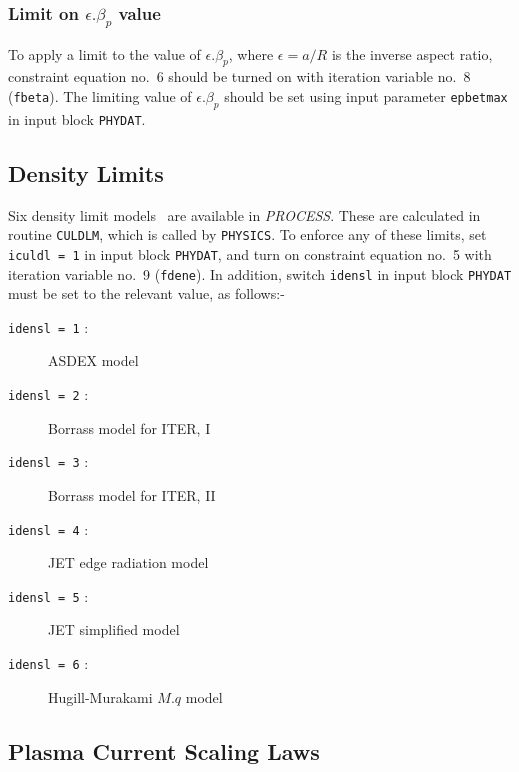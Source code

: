 \documentclass[11pt,a4paper]{report}
\makeatletter
\newcommand{\PSD}{\mbox{\it PROCESS}\@.\/ }
\makeatother
\begin{document}
\subsubsection{Limit on $\epsilon.\beta_p$ value}

To apply a limit to the value of $\epsilon.\beta_p$, where $\epsilon = a/R$ is
the inverse aspect ratio, constraint equation no.\ 6 should be turned on with
iteration variable no.\ 8 ({\tt fbeta}). The limiting value of
$\epsilon.\beta_p$ should be set using input parameter {\tt epbetmax} in input
block {\tt PHYDAT}.

\subsection{Density Limits}

Six density limit models~\cite{172} are available in \PSD These are calculated
in routine {\tt CULDLM}, which is called by {\tt PHYSICS}.  To enforce any of
these limits, set {\tt iculdl = 1} in input block {\tt PHYDAT}, and turn on
constraint equation no.~5 with iteration variable no.~9 ({\tt fdene}).  In
addition, switch {\tt idensl} in input block {\tt PHYDAT} must be set to the
relevant value, as follows:-
\begin{description}
\item [{\tt idensl = 1} :] ASDEX model
\item [{\tt idensl = 2} :] Borrass model for ITER, I
\item [{\tt idensl = 3} :] Borrass model for ITER, II
\item [{\tt idensl = 4} :] JET edge radiation model
\item [{\tt idensl = 5} :] JET simplified model
\item [{\tt idensl = 6} :] Hugill-Murakami $M.q$ model
\end{description}

\subsection{Plasma Current Scaling Laws}
\end{document}
